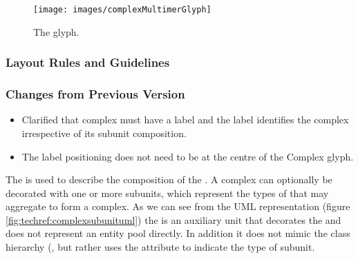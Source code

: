 \begin{figure}[htb]
  \centering
  \texttt{[image: images/complexMultimerGlyph]}
  \caption{The  glyph.}
  \label{fig:techref:complexMultimer}
\end{figure}

\subsubsection{Layout Rules and Guidelines}

\begin{valrules}
\end{valrules}



\subsubsection{Changes from Previous Version}

\begin{itemize}
\item Clarified that complex must have a label and the label
  identifies the complex irrespective of its subunit composition.
\item The label positioning does not need to be at the centre of the
  Complex glyph.
\end{itemize}

\label{defn:Subunit}\label{sec:techref:subunits}

The  is used to describe the composition of the
. A complex can optionally be decorated with one or
more subunits, which represent the types of 
that may aggregate to form a complex. As we can see from the UML
representation (figure \ref{fig:techref:complexsubunituml}) the
 is an auxiliary unit that decorates the
 and does not represent an entity pool directly. In
addition it does not mimic the  class
hierarchy (, but rather uses the
 attribute to indicate the type of subunit.

